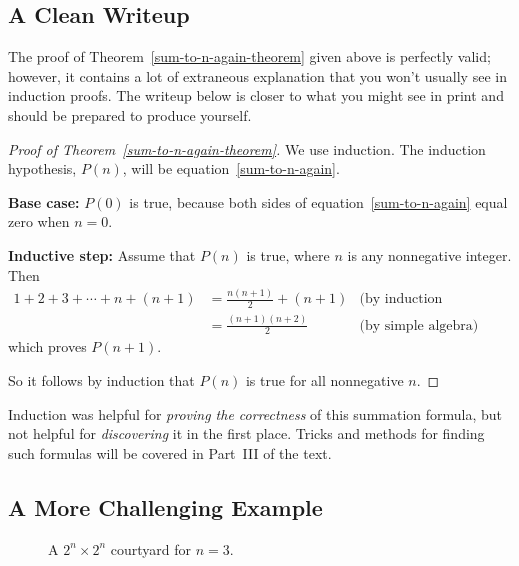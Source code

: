 \subsection{A Clean Writeup}

The proof of Theorem~\ref{sum-to-n-again-theorem} given above is perfectly
valid; however, it contains a lot of extraneous explanation that you won't
usually see in induction proofs.  The writeup below is closer to what you
might see in print and should be prepared to produce yourself.

\begin{proof}[Proof of Theorem~\ref{sum-to-n-again-theorem}]
We use induction.  The induction hypothesis, $P(n)$, will be
equation~\eqref{sum-to-n-again}.

\textbf{Base case:} $P(0)$ is true, because both sides of
equation~\eqref{sum-to-n-again} equal zero when $n=0$.

\textbf{Inductive step:} Assume that $P(n)$ is true, where
$n$ is any nonnegative integer.  Then
\begin{align*}
1 + 2 + 3 + \cdots + n + (n+1)
    & = \frac{n(n+1)}{2} + (n+1) & \text{(by induction hypothesis)}\\
    & = \frac{(n+1)(n+2)}{2}  & \text{(by simple algebra)}
\end{align*}
which proves $P(n+1)$.

So it follows by induction that $P(n)$ is true for all nonnegative $n$.
\end{proof}

Induction was helpful for \emph{proving the correctness} of this
summation formula, but not helpful for \emph{discovering} it in the
first place.   Tricks and methods for finding such formulas will be
covered in Part~III of the text.


\subsection{A More Challenging Example}

\begin{figure}


\caption{A $2^n \times 2^n$ courtyard for $n = 3$.}
\label{fig:2nx2n-tile}
\end{figure}

